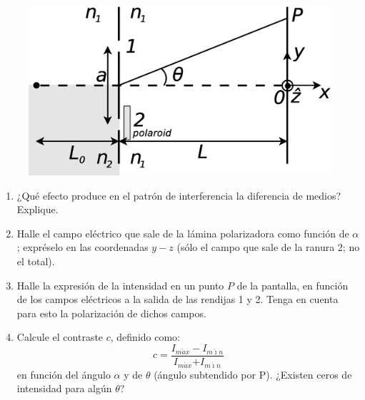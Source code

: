 \documentclass[11pt,spanish]{article}
\begin{document}
\begin{enumerate}
    \begin{figure}[H]
        \centering{}
        \includegraphics[clip,scale=0.3]{figs/ej5-7}
    \end{figure}

    \begin{enumerate}
        \item ¿Qué efecto produce en el patrón de interferencia la diferencia de
        medios? Explique.
        
        \item Halle el campo eléctrico que sale de la lámina polarizadora como
        función de $\alpha$; expréselo en las coordenadas $y-z$ (sólo el campo
        que sale de la ranura 2; no el total).
        
        \item Halle la expresión de la intensidad en un punto $P$ de la pantalla,
        en función de los campos eléctricos a la salida de las rendijas 1
        y 2. Tenga en cuenta para esto la polarización de dichos campos.
        
        \item Calcule el contraste $c$, definido como:
        $$c=\frac{I_{m\acute{a}x}-I_{m\acute{\imath}n}}{I_{m\acute{a}x}\text{+}I_{m\acute{\imath}n}}$$
        en función del ángulo $\alpha$ y de $\theta$ (ángulo subtendido
        por P). ¿Existen ceros de intensidad para algún $\theta$?
    \end{enumerate}



\end{enumerate}
\end{document}
